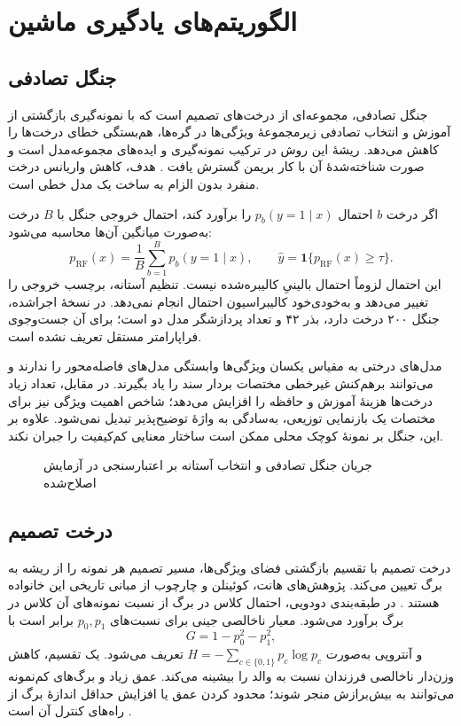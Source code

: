 \section{الگوریتم‌های یادگیری ماشین}
\subsection{جنگل تصادفی}
جنگل تصادفی، مجموعه‌ای از درخت‌های تصمیم است که با نمونه‌گیری بازگشتی از آموزش و انتخاب تصادفی زیرمجموعۀ ویژگی‌ها در گره‌ها، هم‌بستگی خطای درخت‌ها را کاهش می‌دهد. ریشۀ این روش در ترکیب نمونه‌گیری  و ایده‌های مجموعه‌مدل است و صورت شناخته‌شدۀ آن با کار بریمن گسترش یافت \cite{ref103,ref104,ref108}. هدف، کاهش واریانس درخت منفرد بدون الزام به ساخت یک مدل خطی است.

اگر درخت $b$ احتمال $p_b(y=1\mid x)$ را برآورد کند، احتمال خروجی جنگل با $B$ درخت به‌صورت میانگین آن‌ها محاسبه می‌شود:
\begin{equation}
p_{\mathrm{RF}}(x)=\frac1B\sum_{b=1}^{B}p_b(y=1\mid x),\qquad
\widehat y=\mathbf1\{p_{\mathrm{RF}}(x)\ge\tau\}.
\end{equation}
این احتمال لزوماً احتمال بالینیِ کالیبره‌شده نیست. تنظیم آستانه، برچسب خروجی را تغییر می‌دهد و به‌خودی‌خود کالیبراسیون احتمال انجام نمی‌دهد. در نسخۀ اجراشده، جنگل ۲۰۰ درخت دارد، بذر ۴۲ و تعداد پردازشگر مدل دو است؛ برای آن جست‌وجوی فراپارامتر مستقل تعریف نشده است.

مدل‌های درختی به مقیاس یکسان ویژگی‌ها وابستگی مدل‌های فاصله‌محور را ندارند و می‌توانند برهم‌کنش غیرخطی مختصات بردار سند را یاد بگیرند. در مقابل، تعداد زیاد درخت‌ها هزینۀ آموزش و حافظه را افزایش می‌دهد؛ شاخص اهمیت ویژگی نیز برای مختصات یک بازنمایی توزیعی، به‌سادگی به واژۀ توضیح‌پذیر تبدیل نمی‌شود. علاوه بر این، جنگل بر نمونۀ کوچک محلی ممکن است ساختار معنایی کم‌کیفیت  را جبران نکند.
\begin{figure}[htbp]
\centering
\caption{جریان جنگل تصادفی و انتخاب آستانه بر اعتبارسنجی در آزمایش اصلاح‌شده}
\label{fig:rf-flow}
\end{figure}

\subsection{درخت تصمیم}
درخت تصمیم با تقسیم بازگشتی فضای ویژگی‌ها، مسیر تصمیم هر نمونه را از ریشه به برگ تعیین می‌کند. پژوهش‌های هانت، کوئینلن و چارچوب  از مبانی تاریخی این خانواده هستند \cite{ref124,ref125,ref126,ref127,ref128}. در طبقه‌بندی دودویی، احتمال کلاس در برگ از نسبت نمونه‌های آن کلاس در برگ برآورد می‌شود. معیار ناخالصی جینی برای نسبت‌های $p_0,p_1$ برابر است با
\begin{equation}
G=1-p_0^2-p_1^2,
\end{equation}
و آنتروپی به‌صورت $H=-\sum_{c\in\{0,1\}}p_c\log p_c$ تعریف می‌شود. یک تقسیم، کاهش وزن‌دار ناخالصی فرزندان نسبت به والد را بیشینه می‌کند. عمق زیاد و برگ‌های کم‌نمونه می‌توانند به بیش‌برازش منجر شوند؛ محدود کردن عمق یا افزایش حداقل اندازۀ برگ از راه‌های کنترل آن است \cite{ref137,ref138}.

